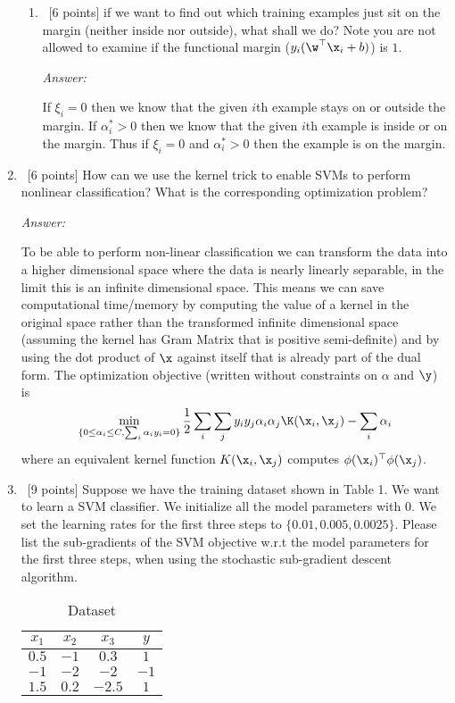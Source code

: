 \documentclass[12pt, fullpage,letterpaper]{article}
\begin{document}
\begin{enumerate}
\begin{enumerate}
		\item~[6 points]  if we want to find out which training examples just sit on the margin (neither inside nor outside), what shall we do? Note you are not allowed to examine if the functional margin (\ie $y_i(\w^\top\x_i +b)$) is $1$.

		\textit{Answer:}

		If $\xi_i = 0$ then we know that the given $i$th example stays on or outside the margin.
		If $\alpha_i^* > 0$ then we know that the given $i$th example is inside or on the margin.
		Thus if $\xi_i = 0$ and $\alpha_i^* > 0$ then the example is on the margin.

	\end{enumerate}
	
	
	\item~[6 points] How can we use the kernel trick to enable SVMs to perform nonlinear classification? What is the corresponding optimization problem?

	\textit{Answer:}

	To be able to perform non-linear classification we can transform the data into a higher dimensional space where the data is nearly linearly separable, in the limit this is an infinite dimensional space. 
	This means we can save computational time/memory by computing the value of a kernel in the original space rather than the transformed infinite dimensional space (assuming the kernel has Gram Matrix that is positive semi-definite) and by using the dot product of $\x$ against itself that is already part of the dual form. 
	The optimization objective (written without constraints on $\alpha$ and $\y$) is
	\[
		\min_{\{0 \le \alpha_i \le C , \sum_i{\alpha_i y_i} = 0\}} {\frac{1}{2} \sum_i \sum_j y_i y_j \alpha_i \alpha_j \K(\x_i, \x_j)} - \sum_i{\alpha_i}
	\]
	where an equivalent kernel function $K(\x_i, \x_j)$ computes $\phi(\x_i)^\top \phi(\x_j)$.
		
	\item~[9 points] Suppose we have the training dataset shown in Table 1. We want to learn a SVM classifier. We initialize all the model parameters with $0$. We set the learning rates for the first three steps to $\{0.01, 0.005, 0.0025\}$.  Please list the sub-gradients of the SVM objective w.r.t the model parameters for the first three steps, when using the stochastic sub-gradient descent algorithm. 
	\begin{table}[h]
		\centering
		\begin{tabular}{ccc|c}
			$x_1$ & $x_2$ & $x_3$ &  $y$\\ 
			\hline\hline
			$0.5$ & $-1$ & $0.3$ & $1$ \\ \hline
			$-1$ & $-2$ & $-2$ & $-1$\\ \hline
			$1.5$ & $0.2$ & $-2.5$ & $1$\\ \hline
		\end{tabular}
	\caption{Dataset}
	\end{table}


\end{enumerate}
\end{document}

